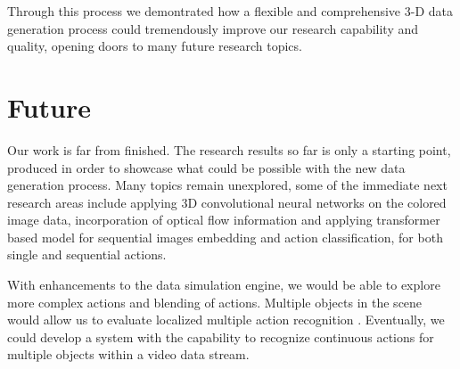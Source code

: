 \documentclass[
	a4paper, %
	10pt, %
	unnumberedsections, %
	twoside, %
]{t0004}
\begin{document}
Through this process we demontrated how a flexible and comprehensive 3-D data generation process could tremendously improve our research capability and quality, opening doors to many future research topics. 

\section{Future}

Our work is far from finished. The research results so far is only a starting point, produced in order to showcase what could be possible with the new data generation process. Many topics remain unexplored, some of the immediate next research areas include applying 3D convolutional neural networks on the colored image data, incorporation of optical flow information and applying transformer based model for sequential images embedding and action classification, for both single and sequential actions.

With enhancements to the data simulation engine, we would be able to explore more complex actions and blending of actions. Multiple objects in the scene would allow us to evaluate localized multiple action recognition \cite{Wu:2023qr}. Eventually, we could develop a system with the capability to recognize continuous actions for multiple objects within a video data stream.





\end{document}
